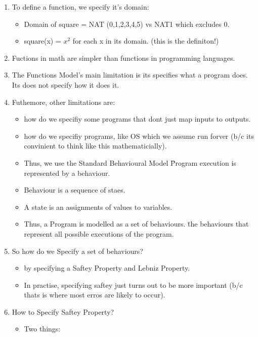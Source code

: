 \documentclass{article}
\begin{document}
\begin{enumerate}
\begin{itemize}
            \end{itemize} 
        \item To define a function, we specify it's domain: \begin{itemize}
            \item Domain of square = NAT (0,1,2,3,4,5) vs NAT1 which excludes 0.
            \item square(x) = $x^2$ for each x in its domain. (this is the definiton!)
            \end{itemize}
        \item Fuctions in math are simpler than functions in programming languages.
        \item The Functions Model's main limitation is \= its specifies what a program does. Its does not specify how it does it.
        \item Futhemore, other limitations are: \begin{itemize}
            \item how do we specifiy some programs that dont just map inputs to outputs.
            \item how do we specifiy programs, like OS which we assume run forver (b/c its convinient to think like this mathematicially).
            \item Thus, we use the Standard Behavioural Model \= Program execution is represented by a behaviour.
            \item Behaviour is a sequence of staes.
            \item A state is an assignments of values to variables. 
            \item Thus, a Program is modelled as a set of behaviours. \=  the behaviours that represent all possible executions of the program.
            \end{itemize}
        \item So how do we Specify a set of behaviours? \begin{itemize}
            \item by specifying a Saftey Property and Lebniz Property.
            \item In practise, specifying saftey just turns out to be more important (b/c thats is where most erros are likely to occur).
        \end{itemize}
        \item How to Specify Saftey Property? \begin{itemize}
            \item Two things: \begin{enumerate}

\end{enumerate}
\end{itemize}
\end{enumerate}
\end{document}
